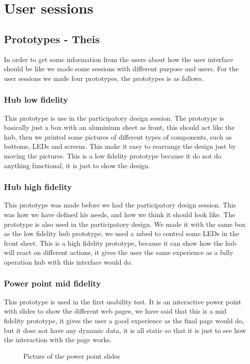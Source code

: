 \chapter{User sessions}
\section{Prototypes - Theis}
In order to get some information from the users about how the user interface should be like we made some sessions with different purpose and users. For the user sessions we made four prototypes, the prototypes is as follows.

\subsection{Hub low fidelity}
This prototype is use in the participatory design session. The prototype is basically just a box with an aluminium sheet as front, this should act like the hub, then we printed some pictures of different types of components, such as bottoms, LEDs and screens. This make it easy to rearrange the design just by moving the pictures. This is a low fidelity prototype because it do not do anything functional, it is just to show the design.
\subsection{Hub high fidelity}
This prototype was made before we had the participatory design session. This was how we have defined his needs, and how we think it should look like. The prototype is also used in the participatory design. We made it with the same box as the low fidelity hub prototype, we used a mbed to control some LEDs in the front sheet. This is a high fidelity prototype, because it can show how the hub will react on different actions, it gives the user the same experience as a fully operation hub with this interface would do.
\subsection{Power point mid fidelity}
This prototype is used in the first usability test. It is an interactive power point with slides to show the different web pages, we have said that this is a mid fidelity prototype, it gives the user a good experience as the final page would do, but it dose not have any dynamic data, it is all static so that it is just to see how the interaction with the page works.
\begin{figure}[h!]
	\center
		\setlength\fboxsep{0pt}
		\setlength\fboxrule{1pt}
   	\caption{Picture of the power point slides}
   	\label{fig:web_interface1}
\end{figure}
